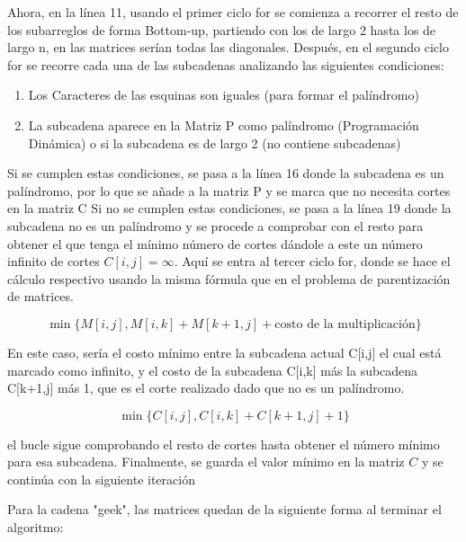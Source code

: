 \documentclass[12pt]{article}
\begin{document}
Ahora, en la línea 11, usando el primer ciclo for se comienza a recorrer el resto de los subarreglos de forma Bottom-up, partiendo con los de largo 2 hasta los de largo n, en las matrices serían todas las diagonales.
Después, en el segundo ciclo for se recorre cada una de las subcadenas analizando las siguientes condiciones:
\begin{enumerate}
    \item Los Caracteres de las esquinas son iguales (para formar el palíndromo)
    \item La subcadena aparece en la Matriz P como palíndromo (Programación Dinámica) o si la subcadena es de largo 2 (no contiene subcadenas)
\end{enumerate}

Si se cumplen estas condiciones, se pasa a la línea 16 donde la subcadena es un palíndromo, por lo que se añade a la matriz P y se marca que no necesita cortes en la matriz C
Si no se cumplen estas condiciones, se pasa a la línea 19 donde la subcadena no es un palíndromo y se procede a comprobar con el resto para obtener el que tenga el mínimo número de cortes dándole a este un número infinito de cortes $C[i,j] = \infty$. Aquí se entra al tercer ciclo for, donde se hace el cálculo respectivo usando la misma fórmula que en el problema de parentización de matrices.

$$\min\{M[i,j], M[i,k] + M[k+1,j] + \text{costo de la multiplicación} \}$$

En este caso, sería el costo mínimo entre la subcadena actual C[i,j] el cual está marcado como infinito, y el costo de la subcadena C[i,k] más la subcadena C[k+1,j] más 1, que es el corte realizado dado que no es un palíndromo.

$$\min\{C[i,j], C[i,k] + C[k+1,j] + 1 \}$$

el bucle sigue comprobando el resto de cortes hasta obtener el número mínimo para esa subcadena. Finalmente, se guarda el valor mínimo en la matriz $C$ y se continúa con la siguiente iteración

Para la cadena "geek", las matrices quedan de la siguiente forma al terminar el algoritmo:
\end{document}
